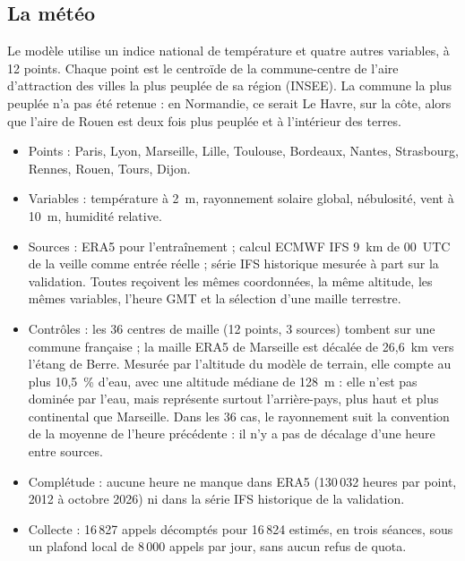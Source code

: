 \documentclass[11pt,a4paper]{article}
\begin{document}
\subsection{La météo}

Le modèle utilise un indice national de température et quatre autres variables, à 12 points. Chaque point est le centroïde de la commune-centre de l'aire d'attraction des villes la plus peuplée de sa région (INSEE). La commune la plus peuplée n'a pas été retenue : en Normandie, ce serait Le Havre, sur la côte, alors que l'aire de Rouen est deux fois plus peuplée et à l'intérieur des terres.

\begin{itemize}
  \item Points : Paris, Lyon, Marseille, Lille, Toulouse, Bordeaux, Nantes, Strasbourg, Rennes, Rouen, Tours, Dijon.
  \item Variables : température à 2~m, rayonnement solaire global, nébulosité, vent à 10~m, humidité relative.
  \item Sources : ERA5 pour l'entraînement ; calcul ECMWF IFS 9~km de 00~UTC de la veille comme entrée réelle ; série IFS historique mesurée à part sur la validation. Toutes reçoivent les mêmes coordonnées, la même altitude, les mêmes variables, l'heure GMT et la sélection d'une maille terrestre.
  \item Contrôles : les 36 centres de maille (12 points, 3 sources) tombent sur une commune française ; la maille ERA5 de Marseille est décalée de 26,6~km vers l'étang de Berre. Mesurée par l'altitude du modèle de terrain, elle compte au plus 10,5~\% d'eau, avec une altitude médiane de 128~m : elle n'est pas dominée par l'eau, mais représente surtout l'arrière-pays, plus haut et plus continental que Marseille. Dans les 36 cas, le rayonnement suit la convention de la moyenne de l'heure précédente : il n'y a pas de décalage d'une heure entre sources.
  \item Complétude : aucune heure ne manque dans ERA5 (130\,032 heures par point, 2012 à octobre 2026) ni dans la série IFS historique de la validation.
  \item Collecte : 16\,827 appels décomptés pour 16\,824 estimés, en trois séances, sous un plafond local de 8\,000 appels par jour, sans aucun refus de quota.
\end{itemize}

\end{document}
